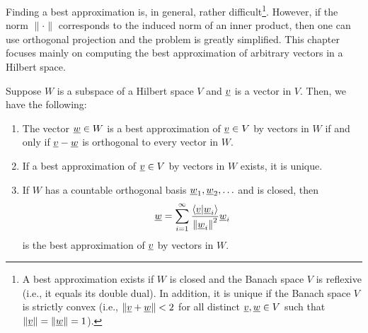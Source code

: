 Finding a best approximation is, in general, rather difficult\footnote{A best approximation exists if $W$ is closed and the Banach space $V$ is reflexive (i.e., it equals its double dual).  In addition, it is unique if the Banach space $V$ is strictly convex (i.e., $\|\underline{v} + \underline{w} \|<2$ for all distinct $\underline{v},\underline{w}\in V$ such that $\|\underline{v}\|=\|\underline{w}\| = 1$).}.
However, if the norm $\| \cdot \|$ corresponds to the induced norm of an inner product, then one can use orthogonal projection and the problem is greatly simplified.
This chapter focuses mainly on computing the best approximation of arbitrary vectors in a Hilbert space.
\begin{theorem} \label{theorem:OrthogonalProjection}
Suppose $W$ is a subspace of a Hilbert space $V$ and $\underline{v}$ is a vector in $V$.
Then, we have the following:
\begin{enumerate}
\item The vector $\underline{w} \in W$ is a best approximation of $\underline{v} \in V$ by vectors in $W$ if and only if $\underline{v} - \underline{w}$ is orthogonal to every vector in $W$.
\item If a best approximation of $\underline{v} \in V$ by vectors in $W$ exists, it is unique.
\item If $W$ has a countable orthogonal basis $\underline{w}_1, \underline{w}_2, \ldots$ and is closed, then
\begin{equation}
\label{equation:OrthogonalProjectionOrthogonalVectors}
\underline{w} = \sum_{i=1}^\infty \frac{ \left\langle \underline{v} | \underline{w}_i \right\rangle }{ \left\| \underline{w}_i \right\|^2 } \underline{w}_i
\end{equation}
is the best approximation of $\underline{v}$ by vectors in $W$.
\end{enumerate}
\end{theorem}
